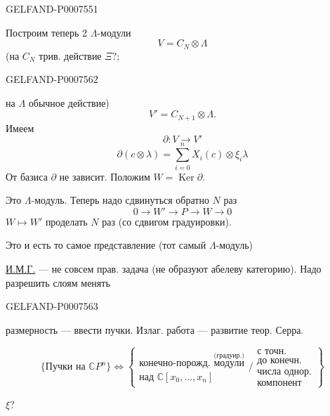 \begin{GelfandAdjacentEvidence}{GELFAND-P000755}{1}

Построим теперь 2 \(\Lambda\)-модули
\begin{equation*}
V=C_N\otimes\Lambda
\tag{18}
\end{equation*}
(на \(C_N\) трив. действие \(\Xi?\);
\end{GelfandAdjacentEvidence}
\begin{GelfandAdjacentEvidence}{GELFAND-P000756}{2}

на \(\Lambda\) обычное действие)
\begin{equation*}
V'=C_{N+1}\otimes\Lambda.
\tag{\(18'\)}
\end{equation*}
Имеем
\begin{equation*}
\partial:V\longrightarrow V'
\tag{19}
\end{equation*}
\begin{equation*}
\partial(c\otimes\lambda)=\sum_{i=0}^n X_i(c)\otimes\xi_i\lambda
\tag{20}
\end{equation*}
От базиса \(\partial\) не зависит.
Положим \(W=\operatorname{Ker}\partial\).

Это \(\Lambda\)-модуль. Теперь надо сдвинуться обратно \(N\) раз
\[
0\longrightarrow W'\longrightarrow P\longrightarrow W\longrightarrow0
\]
\(W\longmapsto W'\) проделать \(N\) раз
(со сдвигом градуировки).

Это и есть то самое представление (тот самый \(\Lambda\)-модуль)

\underline{И.М.Г.}\quad{}
--- не совсем прав. задача (не образуют абелеву категорию).
Надо разрешить слоям менять
\end{GelfandAdjacentEvidence}
\begin{GelfandAdjacentEvidence}{GELFAND-P000756}{3}

размерность --- ввести пучки.
Излаг. работа — развитие теор. Серра.

\[
\{\text{Пучки на }\mathbb CP^n\}\Leftrightarrow
\left\{
\begin{array}{l}
\text{конечно-порожд. }\overset{\text{(градуир.)}}{\text{модули}}\\
\text{над }\mathbb C[x_0,\ldots,x_n]
\end{array}
\Big/
\begin{array}{l}
\text{с точн.}\\
\text{до конечн.}\\
\text{числа однор.}\\
\text{компонент}
\end{array}
\right\}
\]

\(\xi?\)
\end{GelfandAdjacentEvidence}
